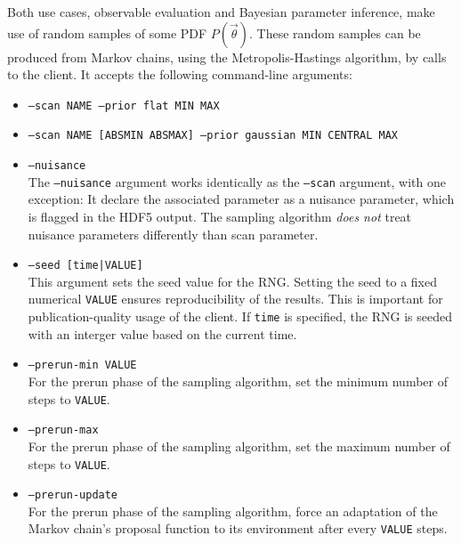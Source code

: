 Both use cases, observable evaluation and Bayesian parameter inference, make use of
random samples of some \gls{PDF} $P(\vec\theta)$. These random
samples can be produced from Markov chains, using the Metropolis-Hastings algorithm,
by calls to the  client. It accepts the following command-line arguments:
\begin{itemize}
    \item[] \texttt{--scan NAME --prior flat MIN MAX}\\[\medskipamount]

    \item[] \texttt{--scan NAME [ABSMIN ABSMAX] --prior gaussian MIN CENTRAL MAX}\\[\medskipamount]

    \item[] \texttt{--nuisance}\\[\medskipamount]
        The \texttt{--nuisance} argument works identically as the \texttt{--scan} argument,
        with one exception: It declare the associated parameter as a nuisance parameter, which
        is flagged in the HDF5 output. The sampling algorithm \emph{does not} treat nuisance
        parameters differently than scan parameter.

    \item[] \texttt{--seed [time|VALUE]}\\[\medskipamount]
        This argument sets the seed value for the \gls{RNG}. Setting the
        seed to a fixed numerical \texttt{VALUE} ensures reproducibility of the results. This
        is important for publication-quality usage of the client. If \texttt{time} is
        specified, the \gls{RNG} is seeded with an interger value based on the current time.

    \item[] \texttt{--prerun-min VALUE}\\[\medskipamount]
        For the prerun phase of the sampling algorithm, set the minimum number of
        steps to \texttt{VALUE}.

    \item[] \texttt{--prerun-max}\\[\medskipamount]
        For the prerun phase of the sampling algorithm, set the maximum number of
        steps to \texttt{VALUE}.

    \item[] \texttt{--prerun-update}\\[\medskipamount]
        For the prerun phase of the sampling algorithm, force an adaptation of the
        Markov chain's proposal function to its environment after every \texttt{VALUE}
        steps.


\end{itemize}

